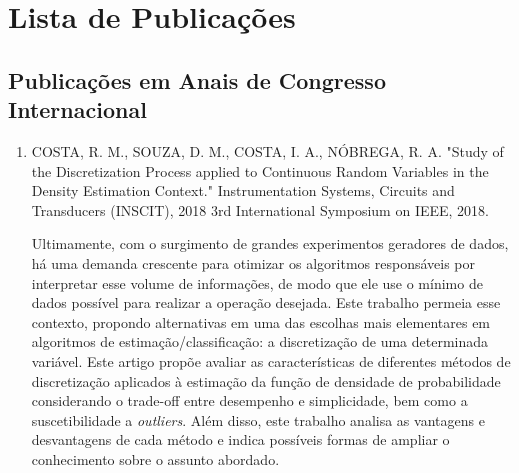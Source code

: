 %
%

\chapter{Lista de Publicações}\label{sec:apendicePubli}


\section{Publicações em Anais de Congresso Internacional}

\begin{enumerate}

\item  COSTA, R. M., SOUZA, D. M., COSTA, I. A., NÓBREGA, R. A. "Study of the Discretization Process applied to Continuous Random Variables in the Density Estimation Context." Instrumentation Systems, Circuits and Transducers (INSCIT), 2018 3rd International Symposium on IEEE, 2018.

Ultimamente, com o surgimento de grandes experimentos geradores de dados, há uma demanda crescente para otimizar os algoritmos responsáveis por interpretar esse volume de informações, de modo que ele use o mínimo de dados possível para realizar a operação desejada. Este trabalho permeia esse contexto, propondo alternativas em uma das escolhas mais elementares em algoritmos de estimação/classificação: a discretização de uma determinada variável. Este artigo propõe avaliar as características de diferentes métodos de discretização aplicados à estimação da função de densidade de probabilidade considerando o trade-off entre desempenho e simplicidade, bem como a suscetibilidade a \textit{outliers}. Além disso, este trabalho analisa as vantagens e desvantagens de cada método e indica possíveis formas de ampliar o conhecimento sobre o assunto abordado.

\end{enumerate}

